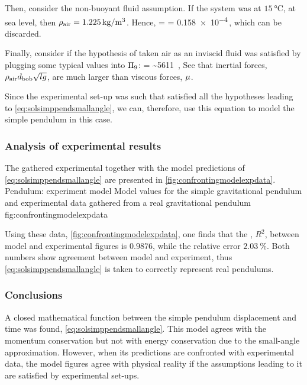 Then, consider the non-buoyant fluid assumption. If the system was at $\SI{15}{\celsius}$, at sea level, then $\rho_\text{air} = \SI{1.225}{kg/m^3}$. Hence, 
\beq
{} =  
                                         = \num{0.158e-4}\,, 
\eeq
which can be discarded.

Finally, consider if the hypothesis of taken air as an inviscid fluid was satisfied by plugging some typical values into $\Pi_9$:
\beq
{}
    = 
    \sim \num{5611} \,,
\eeq
See that inertial forces, $\rho_\text{air}d_\text{bob}\sqrt{lg}$, are much larger than viscous forces, $\mu$. 

Since the experimental set-up was such that satisfied all the hypotheses leading to \cref{eq:solsimppendsmallangle}, we can, therefore, use this equation to model the simple pendulum in this case.


\subsubsection{Analysis of experimental results}
The gathered experimental together with the model predictions of \cref{eq:solsimppendsmallangle} are presented in \cref{fig:confrontingmodelexpdata}.
%
   {Pendulum: experiment \vs model}
   {Model values for the simple gravitational pendulum and experimental data gathered from a real gravitational pendulum}%
   {fig:confrontingmodelexpdata}%

Using these data, \cref{fig:confrontingmodelexpdata}, one finds that the , $R^2$, between model and experimental figures is $\num{0.9876}$, while the relative error $\SI{2.03}{\%}$. Both numbers show agreement between model and experiment, thus \cref{eq:solsimppendsmallangle} is taken to correctly represent real pendulums.


\subsubsection{Conclusions}
A closed mathematical function between the simple pendulum displacement and time was found, \cref{eq:solsimppendsmallangle}. This model agrees with the momentum conservation but not with energy conservation due to the small-angle approximation. However, when its predictions are confronted with experimental data, the model figures agree with physical reality if the assumptions leading to it are satisfied by experimental set-ups.

